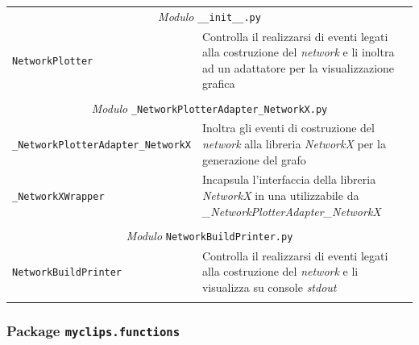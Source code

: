 \begin{longtable}{p{5.5cm}p{6.5cm}}
\multicolumn{2}{c}{\emph{Modulo} \texttt{\_\_init\_\_.py}}\\
	\hdashline[5pt/5pt]
		\texttt{NetworkPlotter} & Controlla il realizzarsi di eventi legati alla costruzione del \emph{network} e li inoltra ad un adattatore per la visualizzazione grafica\\ 
	\hline\\

\multicolumn{2}{c}{\emph{Modulo} \texttt{\_NetworkPlotterAdapter\_NetworkX.py}}\\
	\hdashline[5pt/5pt]
		\texttt{\_NetworkPlotterAdapter\_NetworkX} & Inoltra gli eventi di costruzione del \emph{network} alla libreria \emph{NetworkX} per la generazione del grafo\\ 
	\hdashline[1pt/5pt]
		\texttt{\_NetworkXWrapper} & Incapsula l'interfaccia della libreria \emph{NetworkX} in una utilizzabile da \emph{\_NetworkPlotterAdapter\_NetworkX}\\ 
	\hline\\

\multicolumn{2}{c}{\emph{Modulo} \texttt{NetworkBuildPrinter.py}}\\
	\hdashline[5pt/5pt]
		\texttt{NetworkBuildPrinter} & Controlla il realizzarsi di eventi legati alla costruzione del \emph{network} e li visualizza su console \emph{stdout} \\ 
	\hline\\


\end{longtable}

\subsubsection{Package \texttt{myclips.functions}}

